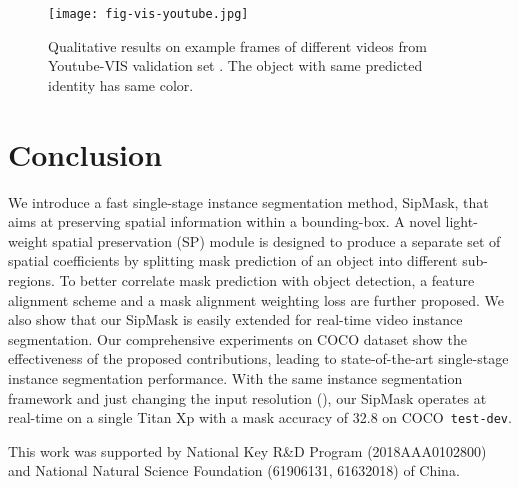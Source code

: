\documentclass[runningheads]{llncs}
\begin{document}
\begin{figure*}[t!]
	\texttt{[image: fig-vis-youtube.jpg]}\caption{Qualitative results on example frames of different videos from Youtube-VIS validation set \cite{Yang_VIS_ICCV_2019}. The object with same predicted identity has same color.  
	}\label{fig:track}
\end{figure*}


\section{Conclusion} 
We introduce a fast single-stage instance segmentation method, SipMask, that aims at preserving spatial information within a bounding-box. A novel light-weight spatial preservation (SP) module is designed to produce a separate set of spatial coefficients by splitting mask prediction of an object into different sub-regions. To better correlate mask prediction with object detection, a feature alignment scheme and a mask alignment weighting loss are further proposed. We also show that our SipMask is easily extended for real-time video instance segmentation. Our comprehensive experiments on COCO dataset show the effectiveness of the proposed contributions, leading to state-of-the-art single-stage instance segmentation performance. With the same instance segmentation framework and just changing the input resolution (), our SipMask operates at real-time on a single Titan Xp with a mask accuracy of 32.8 on COCO~\texttt{test-dev}.

This work was supported by National Key R\&D Program (2018AAA0102800) and National Natural Science Foundation (61906131, 61632018) of China.






\clearpage


\end{document}

